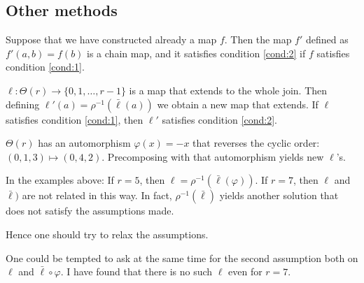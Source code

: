 	\subsection{Other methods} Suppose that we have constructed already a map $f$. Then the map $f'$ defined as $f'(a,b) = f(b)$ is a chain map, and it satisfies condition \eqref{cond:2} if $f$ satisfies condition \eqref{cond:1}.

	$\ell\colon \Theta(r)\to \{0,1,\ldots,r-1\}$ is a map that extends to the whole join. Then defining $\ell'(a) = \rho^{-1}(\bar{\ell}(a))$ we obtain a new map that extends. If $\ell$ satisfies condition \eqref{cond:1}, then $\ell'$ satisfies condition \eqref{cond:2}.

	$\Theta(r)$ has an automorphism $\varphi(x)= -x$ that reverses the cyclic order: $(0,1,3)\mapsto (0,4,2)$. Precomposing with that automorphism yields new $\ell$'s.

	In the examples above: If $r=5$, then $\ell = \rho^{-1}(\bar{\ell}(\varphi))$. If $r=7$, then $\ell$ and $\bar{\ell})$ are not related in this way. In fact, $\rho^{-1}(\bar{\ell})$ yields another solution that does not satisfy the assumptions made.

	Hence one should try to relax the assumptions.
	\begin{remark} One could be tempted to ask at the same time for the second assumption both on $\ell$ and $\bar{\ell}\circ \varphi$. I have found that there is no such $\ell$ even for $r=7$.
	\end{remark}
